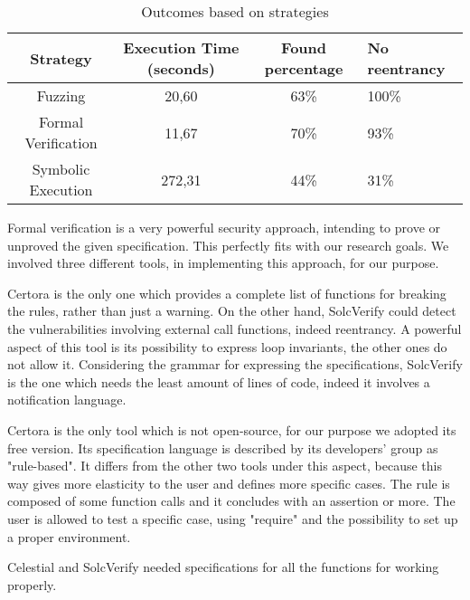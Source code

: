 \begin{center}
    \begin{table*}
        \caption{Outcomes based on strategies}
                \label{tab:Strategies}
                \begin{tabular}{cccl}
                \toprule
                    Strategy & Execution Time (seconds) & Found percentage & No reentrancy\\
                    \midrule
                    Fuzzing & 20,60 & 63\% & 100\% \\ 
                    Formal Verification  & 11,67 & 70\% & 93\% \\ 
                    Symbolic Execution & 272,31  & 44\% & 31\% \\ 
                \bottomrule
        \end{tabular}
    \end{table*}
    
\end{center}

Formal verification is a very powerful security approach, intending to prove or unproved the given specification. 
This perfectly fits with our research goals.
We involved three different tools, in implementing this approach, for our purpose. 

Certora is the only one which provides a complete list of functions for breaking the rules, rather than just a warning. 
On the other hand, SolcVerify could detect the vulnerabilities involving external call functions, indeed reentrancy. A powerful aspect of this tool is its possibility to express 
loop invariants, the other ones do not allow it.
Considering the grammar for expressing the specifications, SolcVerify is the one which needs the least amount of lines of code, indeed it involves a notification language.

Certora is the only tool which is not open-source, for our purpose we adopted its free version.
Its specification language is described by its developers' group as "rule-based". 
It differs from the other two tools under this aspect, because this way gives more elasticity to the user and defines more specific cases.
The rule is composed of some function calls and it concludes with an assertion or more. The user is allowed to test a specific case, 
using "require" and the possibility to set up a proper environment. 

Celestial and SolcVerify needed specifications for all the functions for working properly. 

